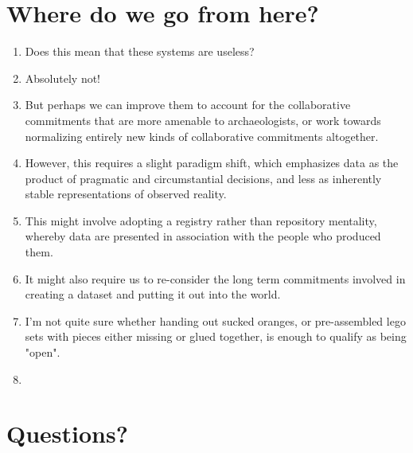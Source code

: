 \documentclass[12pt]{article}
\begin{document}
\section{Where do we go from here?}
\begin{enumerate}
  \item Does this mean that these systems are useless?
  \item Absolutely not!
  \item But perhaps we can improve them to account for the collaborative commitments that are more amenable to archaeologists, or work towards normalizing entirely new kinds of collaborative commitments altogether.
  \item However, this requires a slight paradigm shift, which emphasizes data as the product of pragmatic and circumstantial decisions, and less as inherently stable representations of observed reality.
  \item This might involve adopting a registry rather than repository mentality, whereby data are presented in association with the people who produced them.
  \item It might also require us to re-consider the long term commitments involved in creating a dataset and putting it out into the world.
  \item I'm not quite sure whether handing out sucked oranges, or pre-assembled lego sets with pieces either missing or glued together, is enough to qualify as being "open".
  \item 
\end{enumerate}

\section{Questions?}
\end{document}

